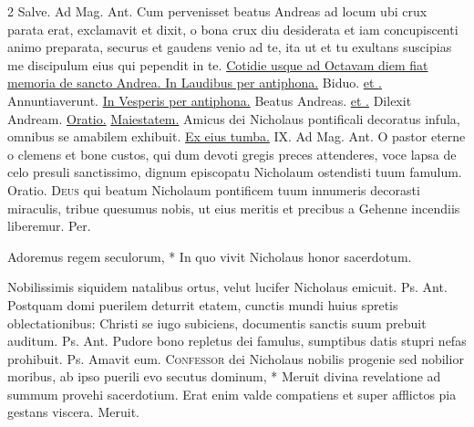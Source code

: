 \begin{multicols*}{2}
 Salve. {\color{Red} Ad Mag. Ant.} Cum pervenisset beatus Andreas ad locum ubi crux parata erat, exclamavit et dixit, o bona crux diu desiderata et iam concupiscenti animo preparata, securus et gaudens venio ad te, ita ut et tu exultans suscipias me discipulum eius qui pependit in te.
\newline \ul{Cotidie usque ad Octavam diem fiat memoria de sancto Andrea. In Laudibus per antiphona.} Biduo. \ul{et \Vbar .} Annuntiaverunt. \ul{In Vesperis per antiphona.} Beatus Andreas. \ul{et \Vbar .} Dilexit Andream. \ul{Oratio.} \hyperlink{maiestatem-andree}{Maiestatem.}
{\color{Red} }
 Amicus dei Nicholaus pontificali decoratus infula, omnibus se amabilem exhibuit. \R \hyperlink{ex-eius-tumba}{Ex eius tumba.} {\color{Red} IX. Ad Mag. Ant.} O pastor eterne o clemens et bone custos, qui dum devoti gregis preces attenderes, voce lapsa de celo presuli sanctissimo, dignum episcopatu Nicholaum ostendisti tuum famulum. {\color{Red} Oratio.}
\lettrine[lines=2]{\zallmancaps \color{Red} D}{eus} qui beatum Nicholaum pontificem tuum innumeris decorasti miraculis, tribue quesumus nobis, ut eius meritis et precibus a Gehenne incendiis liberemur. Per.
\begin{invitatory}
{Adoremus regem seculorum, * In quo vivit Nicholaus honor sacerdotum.}
\end{invitatory}
 Nobilissimis siquidem natalibus ortus, velut lucifer Nicholaus emicuit. {\color{Red} Ps.}  {\color{Red} Ant.} Postquam domi puerilem deturrit etatem, cunctis mundi huius spretis oblectationibus: Christi se iugo subiciens, documentis sanctis suum prebuit auditum. {\color{Red} Ps.}  {\color{Red} Ant.} Pudore bono repletus dei famulus, sumptibus datis stupri nefas prohibuit. {\color{Red} Ps.}  \V Amavit eum. \R
\lettrine[lines=2]{\zallmancaps \color{Blue} C}{onfessor} \hypertarget{confessor-dei-nicholaus}{\label{confessor-dei-nicholaus}} dei Nicholaus nobilis progenie sed nobilior moribus, ab ipso puerili evo secutus dominum, * Meruit divina revelatione ad summum provehi sacerdotium. \V Erat enim valde compatiens et super afflictos pia gestans viscera. Meruit.

\end{multicols*}
